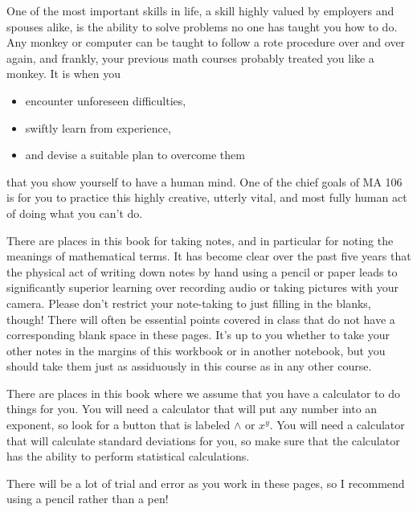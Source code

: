 \documentclass[12pt,leqno]{book}
\begin{document}
One of the most important skills in life, a skill highly valued by employers and spouses alike,
is the ability to solve problems no one has taught you how to do.
Any monkey or computer can be taught to follow a rote procedure over and over again,
and frankly, your previous math courses probably treated you like a monkey.
It is when you
  \begin{itemize}
		\item encounter unforeseen difficulties,
		\item swiftly learn from experience,
		\item and devise a suitable plan to overcome them
	\end{itemize}
that you show yourself to have a human mind.
One of the chief goals of MA 106
is for you to practice this highly creative, utterly vital, and most fully human act
of doing what you can't do.

There are places in this book for taking notes, and in particular for noting the meanings of mathematical terms. It has become clear over the past five years that the physical act of writing down notes by hand using a pencil or paper leads to significantly superior learning over recording audio or taking pictures with your camera.
Please don't restrict your note-taking to just filling in the blanks, though!
There will often be essential points covered in class
that do not have a corresponding blank space in these pages.
It's up to you whether to take your other notes in the margins of this workbook or in another notebook,
but you should take them just as assiduously in this course as in any other course.

There are places in this book where we assume that you have a calculator to do things for you.  You will need a calculator that will put any number into an exponent, so look for a button that is labeled $\wedge$ or $x^y$.  You will need a calculator that will calculate standard deviations for you, so make sure that the calculator has the ability to perform statistical calculations.

There will be a lot of trial and error as you work in these pages,
so I recommend using a pencil rather than a pen!

~\ifodd\value{page}\relax\else\newpage\fi


\mainmatter

\pagestyle{fancy}


%


%
%


\appendix


\clearpage
{}
\printindex
\end{document}
